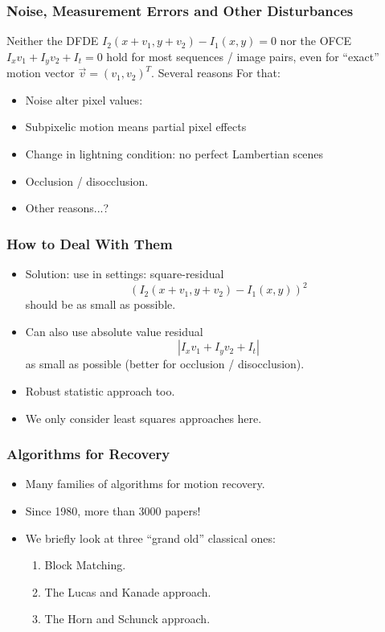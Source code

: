 \documentclass[10pt]{beamer}
\newcommand{\myemph}[1]{{\color{blue}{#1}}}
\begin{document}
\begin{frame}
  \frametitle{Noise, Measurement Errors and Other Disturbances}
  Neither the DFDE $I_2(x+v_1,y+v_2) - I_1(x,y) = 0$ nor the OFCE $I_x v_1 + I_y v_2 + I_t = 0$
    hold for most sequences / image pairs, even for ``exact'' motion vector $\vec{v} = (v_1,v_2)^T$.
    Several reasons For that:
 \begin{itemize}
  \item Noise alter pixel values:
  \item Subpixelic motion means partial pixel effects
  \item Change in lightning condition: no perfect Lambertian scenes
  \item Occlusion / disocclusion.
  \item Other reasons...?
  \end{itemize}
\end{frame}
\begin{frame}
  \frametitle{How to Deal With Them }
  \begin{itemize}
  \item Solution: use in \myemph{least-squares} settings: square-residual
    $$
    \left(I_2(x+v_1,y+v_2) - I_1(x,y)\right)^2
    $$
    should be as small as possible.
  \item Can also use absolute value residual
    $$
    |I_x v_1 + I_y v_2 + I_t|
    $$
    as small as possible (better for occlusion / disocclusion).
  \item Robust statistic approach too.
  \item We only consider least squares approaches here.
  \end{itemize}
\end{frame}



\begin{frame}
  \frametitle{Algorithms for Recovery}
  \begin{itemize}
  \item Many families of algorithms for motion recovery.\vfill
  \item Since 1980, more than 3000 papers!\vfill
  \item We briefly look at three ``grand old'' classical ones:\vfill
    \begin{enumerate}
    \item Block Matching.\vfill
    \item The Lucas and Kanade approach.\vfill
    \item The Horn and Schunck approach.
    \end{enumerate}
  \end{itemize}
\end{frame}
\end{document}
